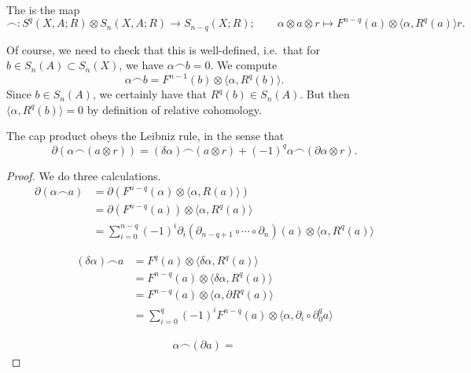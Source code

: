 \documentclass[main.tex]{subfiles}
\begin{document}
\begin{definition}
  \label{def:cap_product}
  The  is the map
  \begin{equation*}
    \frown\colon S^{q}(X, A; R) \otimes S_{n}(X, A; R) \to S_{n-q}(X; R); \qquad \alpha \otimes a \otimes r \mapsto F^{n-q}(a) \otimes \langle \alpha, R^{q}(a) \rangle r.
  \end{equation*}
\end{definition}

Of course, we need to check that this is well-defined, i.e.\ that for $b \in S_{n}(A) \subset S_{n}(X)$, we have $\alpha \frown b = 0$. We compute
\begin{equation*}
  \alpha \frown b = F^{n-1}(b) \otimes \langle \alpha, R^{q}(b) \rangle.
\end{equation*}
Since $b \in S_{n}(A)$, we certainly have that $R^{q}(b) \in S_{n}(A)$. But then $\langle\alpha, R^{q}(b)\rangle = 0$ by definition of relative cohomology.

\begin{lemma}
  \label{lemma:cap_product_leibniz_rule}
  The cap product obeys the Leibniz rule, in the sense that
  \begin{equation*}
    \partial(\alpha \frown (a \otimes r)) = (\delta \alpha) \frown (a \otimes r) + (-1)^{q} \alpha \frown (\partial \alpha \otimes r).
  \end{equation*}
\end{lemma}
\begin{proof}
  We do three calculations.
  \begin{align*}
    \partial( \alpha \frown a ) &= \partial(F^{n-q}(\alpha) \otimes \langle \alpha, R(a) \rangle) \\
    &= \partial(F^{n-q}(a)) \otimes \langle \alpha, R^{q}(a) \rangle \\
    &= \sum_{i = 0}^{n-q} (-1)^{i} \partial_{i} (\partial_{n-q+1} \circ \cdots \circ \partial_{n})(a) \otimes\langle \alpha, R^{q}(a) \rangle
  \end{align*}

  \begin{align*}
    (\delta \alpha) \frown a &= F^{q}(a) \otimes \langle \delta \alpha, R^{q}(a) \rangle \\
    &= F^{n-q}(a) \otimes \langle \delta \alpha, R^{q}(a) \rangle \\
    &= F^{n-q}(a) \otimes \langle \alpha, \partial R^{q}(a) \rangle \\
    &= \sum_{i = 0}^{q} (-1)^{i} F^{n-q}(a) \otimes \langle \alpha, \partial_{i} \circ \partial_{0}^{q} a \rangle
  \end{align*}

  \begin{align*}
    \alpha \frown (\partial a) =
  \end{align*}
\end{proof}
\end{document}
